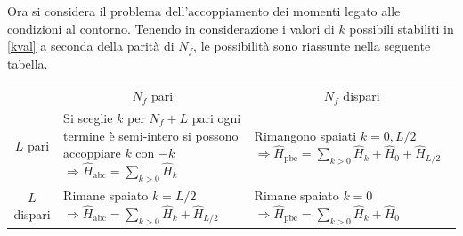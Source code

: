 \documentclass[11pt, a4paper]{scrartcl}
\theoremstyle{style}
\theoremstyle{style1}
\numberwithin{equation}{subsection}
\begin{document}
Ora si considera il problema dell'accoppiamento dei momenti legato alle condizioni al contorno. 
Tenendo in considerazione i valori di $k$ possibili stabiliti in \ref{kval} a seconda della parit\`a di $N_f$, le possibilit\`a sono riassunte nella seguente tabella.
\begin{table}[h!]
	\centering
	\begin{tabular}{c| l | l |}
	\multicolumn{1}{c}{} & \multicolumn{1}{c}{$N_f$ pari} & \multicolumn{1}{c}{$N_f$ dispari} \\
		\cline{2-3}
	$L$ pari & \makecell[l]{Si sceglie $k$ per $N_f + L $ pari\\ ogni termine \`e semi-intero \\ si possono accoppiare $k$ con $-k$\\ $\Rightarrow \hat{H}_\text{abc} = \sum_{k>0}^{} \hat{H}_k$} & \makecell[l]{Rimangono spaiati $k=0, L / 2$\\ $\Rightarrow \hat{H}_\text{pbc} = \sum_{k>0}^{} \hat{H}_k + \hat{H}_0 + \hat{H}_{L / 2} $}\\
		\cline{2-3}
	$L$ dispari & \makecell[l]{Rimane spaiato $k= L / 2$\\ $\Rightarrow \hat{H}_\text{abc}= \sum_{k>0}^{} \hat{H}_k + \hat{H}_{L / 2} $} &\makecell[l]{Rimane spaiato $k=0$\\ $\Rightarrow \hat{H}_\text{pbc} = \sum_{k>0}^{} \hat{H}_k + \hat{H}_0$} \\
		\cline{2-3}
	\end{tabular}
\end{table}
\end{document}
